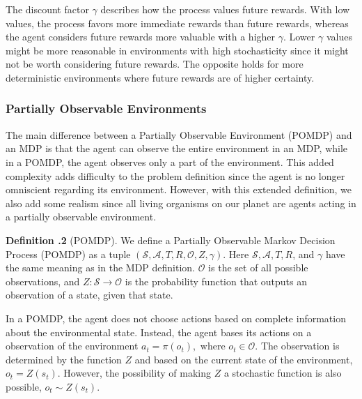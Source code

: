 \documentclass[12pt,A4]{report}
\theoremstyle{definition}
\newtheorem{definition}{Definition}[section]
\begin{document}
The discount factor $\gamma$ describes how the process values future rewards. With low values, the process favors more immediate rewards than future rewards, whereas the agent considers future rewards more valuable with a higher $\gamma$. Lower $\gamma$ values might be more reasonable in environments with high stochasticity since it might not be worth considering future rewards. The opposite holds for more deterministic environments where future rewards are of higher certainty.


\subsubsection{Partially Observable Environments}

The main difference between a Partially Observable Environment (POMDP) and an MDP is that the agent can observe the entire environment in an MDP, while in a POMDP, the agent observes only a part of the environment. This added complexity adds difficulty to the problem definition since the agent is no longer omniscient regarding its environment. However, with this extended definition, we also add some realism since all living organisms on our planet are agents acting in a partially observable environment.

\begin{displayquote}
  \textbf{Definition \thesection.2} (POMDP). We define a Partially Observable Markov Decision Process (POMDP) as a tuple $(\mathcal{S}, \mathcal{A}, T, R, \mathcal{O}, Z, \gamma)$. Here $\mathcal{S}, \mathcal{A}, T, R$, and $\gamma$ have the same meaning as in the MDP definition. $\mathcal{O}$ is the set of all possible observations, and $Z : \mathcal{S} \rightarrow \mathcal{O}$ is the probability function that outputs an observation of a state, given that state. 
\end{displayquote}
In a POMDP, the agent does not choose actions based on complete information about the environmental state. Instead, the agent bases its actions on a observation of the environment $a_t = \pi(o_t), \text{ where } o_t \in \mathcal{O}$. The observation is determined by the function $Z$ and based on the current state of the environment, $o_t = Z(s_t)$. However, the possibility of making $Z$ a stochastic function is also possible, $o_t \sim Z(s_t)$.
\end{document}

